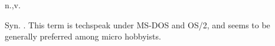  n.,v.

Syn. . This term is techspeak under MS-DOS and OS/2, and seems
to be generally preferred among micro hobbyists.

